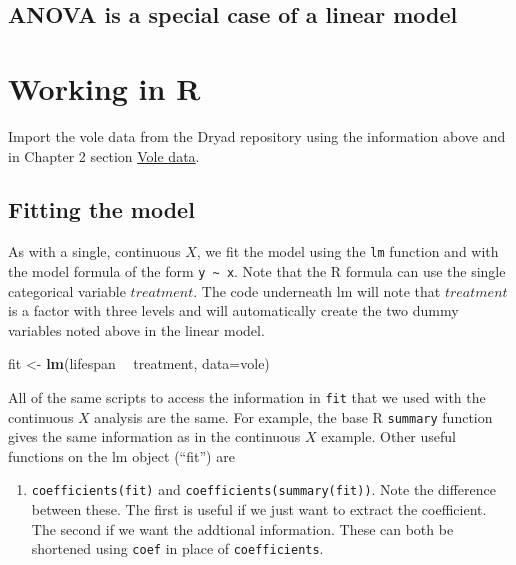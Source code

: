 \documentclass[]{book}
\newenvironment{Shaded}{\begin{snugshade}}{\end{snugshade}}
\newcommand{\KeywordTok}[1]{\textcolor[rgb]{0.13,0.29,0.53}{\textbf{#1}}}
\newcommand{\DataTypeTok}[1]{\textcolor[rgb]{0.13,0.29,0.53}{#1}}
\newcommand{\StringTok}[1]{\textcolor[rgb]{0.31,0.60,0.02}{#1}}
\newcommand{\OperatorTok}[1]{\textcolor[rgb]{0.81,0.36,0.00}{\textbf{#1}}}
\newcommand{\NormalTok}[1]{#1}
\providecommand{\tightlist}{%
  \setlength{\itemsep}{0pt}\setlength{\parskip}{0pt}}
\begin{document}
\subsection{ANOVA is a special case of a linear
model}\label{anova-is-a-special-case-of-a-linear-model}

\section{Working in R}\label{working-in-r-1}

Import the vole data from the Dryad repository using the information
above and in Chapter 2 section \protect\hyperlink{vole-data}{Vole data}.

\subsection{Fitting the model}\label{fitting-the-model}

As with a single, continuous \(X\), we fit the model using the
\texttt{lm} function and with the model formula of the form
\texttt{y\ \textasciitilde{}\ x}. Note that the R formula can use the
single categorical variable \(treatment\). The code underneath lm will
note that \(treatment\) is a factor with three levels and will
automatically create the two dummy variables noted above in the linear
model.

\begin{Shaded}
\begin{Highlighting}[]
\NormalTok{fit <-}\StringTok{ }\KeywordTok{lm}\NormalTok{(lifespan }\OperatorTok{~}\StringTok{ }\NormalTok{treatment, }\DataTypeTok{data=}\NormalTok{vole)}
\end{Highlighting}
\end{Shaded}

All of the same scripts to access the information in \texttt{fit} that
we used with the continuous \(X\) analysis are the same. For example,
the base R \texttt{summary} function gives the same information as in
the continuous \(X\) example. Other useful functions on the lm object
(``fit'') are

\begin{enumerate}
\def\labelenumi{\arabic{enumi}.}
\tightlist
\item
  \texttt{coefficients(fit)} and \texttt{coefficients(summary(fit))}.
  Note the difference between these. The first is useful if we just want
  to extract the coefficient. The second if we want the addtional
  information. These can both be shortened using \texttt{coef} in place
  of \texttt{coefficients}.
\end{enumerate}
\end{document}
